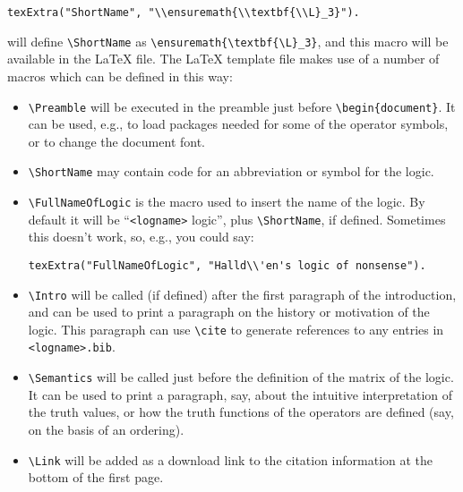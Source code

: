 \documentclass[]{article}
\begin{document}
\begin{itemize}
\begin{verbatim}
texExtra("ShortName", "\\ensuremath{\\textbf{\\L}_3}").
\end{verbatim}

  will define \texttt{\textbackslash{}ShortName} as
  \texttt{\textbackslash{}ensuremath\{\textbackslash{}textbf\{\textbackslash{}L\}\_3\}},
  and this macro will be available in the LaTeX file. The LaTeX template
  file makes use of a number of macros which can be defined in this way:

  \begin{itemize}
  \item
    \texttt{\textbackslash{}Preamble} will be executed in the preamble
    just before \texttt{\textbackslash{}begin\{document\}}. It can be
    used, e.g., to load packages needed for some of the operator
    symbols, or to change the document font.
  \item
    \texttt{\textbackslash{}ShortName} may contain code for an
    abbreviation or symbol for the logic.
  \item
    \texttt{\textbackslash{}FullNameOfLogic} is the macro used to insert
    the name of the logic. By default it will be
    ``\texttt{\textless{}logname\textgreater{}} logic'', plus
    \texttt{\textbackslash{}ShortName}, if defined. Sometimes this
    doesn't work, so, e.g., you could say:

\begin{verbatim}
texExtra("FullNameOfLogic", "Halld\\'en's logic of nonsense").
\end{verbatim}
  \item
    \texttt{\textbackslash{}Intro} will be called (if defined) after the
    first paragraph of the introduction, and can be used to print a
    paragraph on the history or motivation of the logic. This paragraph
    can use \texttt{\textbackslash{}cite} to generate references to any
    entries in \texttt{\textless{}logname\textgreater{}.bib}.
  \item
    \texttt{\textbackslash{}Semantics} will be called just before the
    definition of the matrix of the logic. It can be used to print a
    paragraph, say, about the intuitive interpretation of the truth
    values, or how the truth functions of the operators are defined
    (say, on the basis of an ordering).
  \item
    \texttt{\textbackslash{}Link} will be added as a download link to
    the citation information at the bottom of the first page.
  \end{itemize}
\end{itemize}
\end{document}
